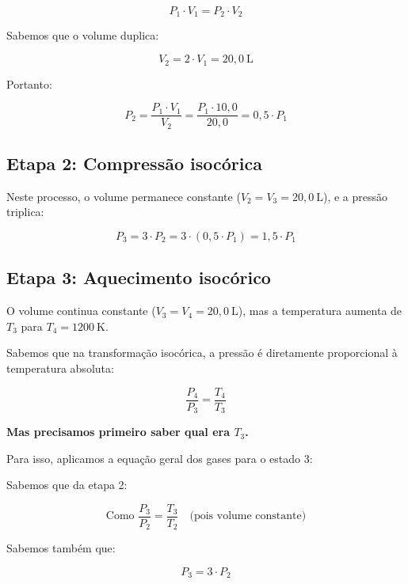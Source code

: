 \begin{flushleft}
\begin{equation}
P_1 \cdot V_1 = P_2 \cdot V_2
\end{equation}

Sabemos que o volume duplica:

\begin{equation}
V_2 = 2 \cdot V_1 = 20,0 \ \text{L}
\end{equation}

Portanto:

\begin{equation}
P_2 = \frac{P_1 \cdot V_1}{V_2} = \frac{P_1 \cdot 10,0}{20,0} = 0,5 \cdot P_1
\end{equation}

\subsection*{Etapa 2: Compressão isocórica}

Neste processo, o volume permanece constante ($V_2 = V_3 = 20,0 \ \text{L}$), e a pressão triplica:

\begin{equation}
P_3 = 3 \cdot P_2 = 3 \cdot (0,5 \cdot P_1) = 1,5 \cdot P_1
\end{equation}

\subsection*{Etapa 3: Aquecimento isocórico}

O volume continua constante ($V_3 = V_4 = 20,0 \ \text{L}$), mas a temperatura aumenta de $T_3$ para $T_4 = 1200 \ \text{K}$.

Sabemos que na transformação isocórica, a pressão é diretamente proporcional à temperatura absoluta:

\begin{equation}
\frac{P_4}{P_3} = \frac{T_4}{T_3}
\end{equation}

\textbf{Mas precisamos primeiro saber qual era $T_3$.}

Para isso, aplicamos a equação geral dos gases para o estado 3:

Sabemos que da etapa 2:

\[
\text{Como } \frac{P_3}{P_2} = \frac{T_3}{T_2} \quad \text{(pois volume constante)}
\]

Sabemos também que:

\begin{equation}
P_3 = 3 \cdot P_2
\end{equation}


\end{flushleft}
